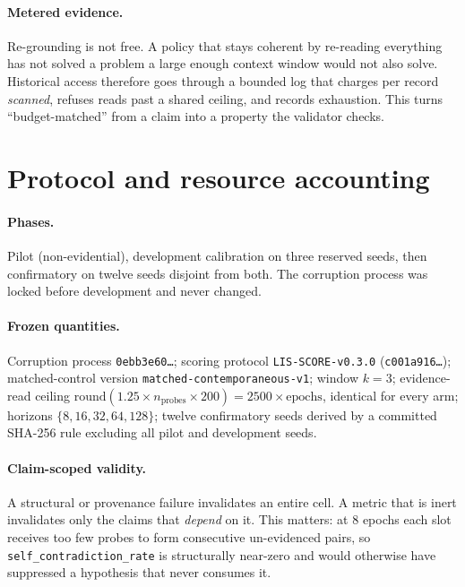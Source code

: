 \documentclass[11pt]{article}
\newcommand{\code}[1]{\texttt{\small #1}}
\begin{document}
\paragraph{Metered evidence.} Re-grounding is not free. A policy that stays
coherent by re-reading everything has not solved a problem a large enough context
window would not also solve. Historical access therefore goes through a bounded
log that charges per record \emph{scanned}, refuses reads past a shared ceiling,
and records exhaustion. This turns ``budget-matched'' from a claim into a
property the validator checks.

\section{Protocol and resource accounting}
\label{sec:protocol}

\paragraph{Phases.} Pilot (non-evidential), development calibration on three
reserved seeds, then confirmatory on twelve seeds disjoint from both. The
corruption process was locked before development and never changed.

\paragraph{Frozen quantities.} Corruption process
\code{0ebb3e60\ldots}; scoring protocol \code{LIS-SCORE-v0.3.0}
(\code{c001a916\ldots}); matched-control version
\code{matched-contemporaneous-v1}; window $k=3$; evidence-read ceiling
$\mathrm{round}(1.25 \times n_{\text{probes}} \times 200) = 2500 \times
\text{epochs}$, identical for every arm; horizons $\{8,16,32,64,128\}$; twelve
confirmatory seeds derived by a committed SHA-256 rule excluding all pilot and
development seeds.

\paragraph{Claim-scoped validity.} A structural or provenance failure invalidates
an entire cell. A metric that is inert invalidates only the claims that
\emph{depend} on it. This matters: at 8 epochs each slot receives too few probes
to form consecutive un-evidenced pairs, so \code{self\_contradiction\_rate} is
structurally near-zero and would otherwise have suppressed a hypothesis that
never consumes it.
\end{document}
